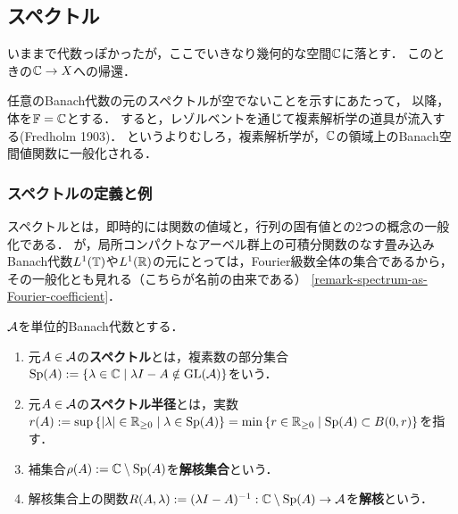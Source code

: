 \documentclass[uplatex,dvipdfmx]{jsreport}
\begin{document}
\subsection{スペクトル}

\begin{tcolorbox}[colframe=ForestGreen, colback=ForestGreen!10!white,breakable,colbacktitle=ForestGreen!40!white,coltitle=black,fonttitle=\bfseries\sffamily,
title=]
    いままで代数っぽかったが，ここでいきなり幾何的な空間$\mathbb{C}$に落とす．
    このときの$\mathbb{C}\to X$への帰還．

    任意のBanach代数の元のスペクトルが空でないことを示すにあたって，
    以降，体を$\mathbb{F}=\mathbb{C}$とする．
    すると，レゾルベントを通じて複素解析学の道具が流入する(Fredholm 1903)．
    というよりむしろ，複素解析学が，$\mathbb{C}$の領域上のBanach空間値関数に一般化される．
\end{tcolorbox}

\subsubsection{スペクトルの定義と例}

\begin{tcolorbox}[colframe=ForestGreen, colback=ForestGreen!10!white,breakable,colbacktitle=ForestGreen!40!white,coltitle=black,fonttitle=\bfseries\sffamily,
title=]
    スペクトルとは，即時的には関数の値域と，行列の固有値との2つの概念の一般化である．
    が，局所コンパクトなアーベル群上の可積分関数のなす畳み込みBanach代数$L^1(\mathbb{T})$や$L^1(\mathbb{R})$の元にとっては，Fourier級数全体の集合であるから，その一般化とも見れる（こちらが名前の由来である）
    \ref{remark-spectrum-as-Fourier-coefficient}．
\end{tcolorbox}

\begin{definition}
    $\mathcal{A}$を単位的Banach代数とする．
    \begin{enumerate}
        \item 元$A\in\mathcal{A}$の\textbf{スペクトル}とは，複素数の部分集合$\mathrm{Sp}(A):=\left\{\lambda\in\mathbb{C}\mid\lambda I-A\notin\mathrm{GL}(\mathcal{A})\right\}$をいう．
        \item 元$A\in\mathcal{A}$の\textbf{スペクトル半径}とは，実数$r(A):=\sup\left\{\lvert\lambda\rvert\in\mathbb{R}_{\ge 0}\mid\lambda\in\mathrm{Sp}(A)\right\}=\min\left\{r\in\mathbb{R}_{\ge0}\mid\mathrm{Sp}(A)\subset B(0,r)\right\}$を指す．
        \item 補集合$\rho(A):=\mathbb{C}\setminus\mathrm{Sp}(A)$を\textbf{解核集合}という．
        \item 解核集合上の関数$R(A,\lambda):=(\lambda I-A)^{-1}:\mathbb{C}\setminus\mathrm{Sp}(A)\to\mathcal{A}$を\textbf{解核}という．
    \end{enumerate}
\end{definition}
\end{document}
